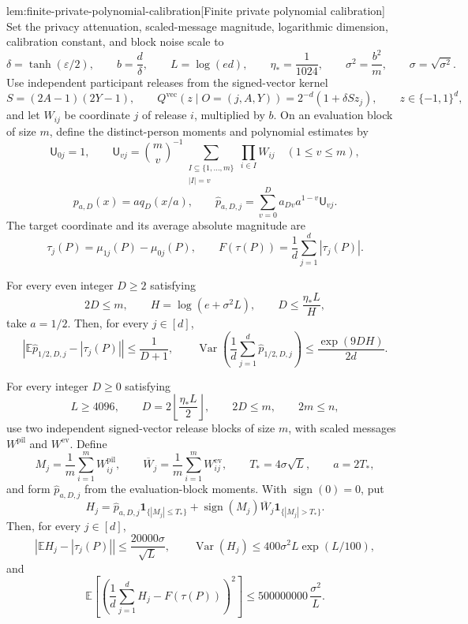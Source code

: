 \documentclass[11pt]{article}
\begin{document}
\begin{lemmav}{lem:finite-private-polynomial-calibration}[Finite private polynomial calibration]
Set the privacy attenuation, scaled-message magnitude, logarithmic dimension, calibration constant, and block noise scale to
\[
 \delta=\tanh(\varepsilon/2),\qquad
 b=\frac d\delta,\qquad
 L=\log(ed),\qquad
 \eta_*=\frac1{1024},\qquad
 \sigma^2=\frac{b^2}{m},\qquad
 \sigma=\sqrt{\sigma^2}.
\]
Use independent participant releases from the signed-vector kernel
\[
 S=(2A-1)(2Y-1),\qquad
 Q^{\mathrm{vec}}(z\mid O=(j,A,Y))
 =2^{-d}(1+\delta S z_j),
 \qquad z\in\{-1,1\}^d,
\]
and let \(W_{ij}\) be coordinate \(j\) of release \(i\), multiplied by \(b\). On an evaluation block of size \(m\), define the distinct-person moments and polynomial estimates by
\[
 \mathsf U_{0j}=1,\qquad
 \mathsf U_{vj}
 =\binom mv^{-1}
   \sum_{\substack{I\subseteq\{1,\ldots,m\}\\|I|=v}}
      \prod_{i\in I}W_{ij}
 \quad(1\le v\le m),
\]
\[
 p_{a,D}(x)=a q_D(x/a),\qquad
 \widehat p_{a,D,j}
 =\sum_{v=0}^D a_{Dv}a^{1-v}\mathsf U_{vj}.
\]
The target coordinate and its average absolute magnitude are
\[
 \tau_j(P)=\mu_{1j}(P)-\mu_{0j}(P),\qquad
 F(\tau(P))=\frac1d\sum_{j=1}^d|\tau_j(P)|.
\]

For every even integer \(D\ge2\) satisfying
\[
 2D\le m,\qquad
 H=\log(e+\sigma^2L),\qquad
 D\le\frac{\eta_*L}{H},
\]
take \(a=1/2\). Then, for every \(j\in[d]\),
\[
 \left|\mathbb E\widehat p_{1/2,D,j}-|\tau_j(P)|\right|
 \le\frac1{D+1},
 \qquad
 \operatorname{Var}\!\left(\frac1d\sum_{j=1}^d
                    \widehat p_{1/2,D,j}\right)
 \le\frac{\exp(9DH)}{2d}.
\]

For every integer \(D\ge0\) satisfying
\[
 L\ge4096,\qquad
 D=2\left\lfloor\frac{\eta_*L}{2}\right\rfloor,\qquad
 2D\le m,\qquad
 2m\le n,
\]
use two independent signed-vector release blocks of size \(m\), with scaled messages \(W^{\mathrm{pil}}\) and \(W^{\mathrm{ev}}\). Define
\[
 M_j=\frac1m\sum_{i=1}^mW^{\mathrm{pil}}_{ij},\qquad
 \overline W_j=\frac1m\sum_{i=1}^mW^{\mathrm{ev}}_{ij},\qquad
 T_*=4\sigma\sqrt L,\qquad a=2T_*,
\]
and form \(\widehat p_{a,D,j}\) from the evaluation-block moments. With \(\operatorname{sign}(0)=0\), put
\[
 H_j=\widehat p_{a,D,j}\mathbf1_{\{|M_j|\le T_*\}}
       +\operatorname{sign}(M_j)\overline W_j
          \mathbf1_{\{|M_j|>T_*\}}.
\]
Then, for every \(j\in[d]\),
\[
 \left|\mathbb EH_j-|\tau_j(P)|\right|
 \le\frac{20000\sigma}{\sqrt L},
 \qquad
 \operatorname{Var}(H_j)
 \le400\sigma^2L\exp(L/100),
\]
and
\[
 \mathbb E\!\left[
   \left(\frac1d\sum_{j=1}^dH_j-F(\tau(P))\right)^2
 \right]
 \le500000000\,\frac{\sigma^2}{L}.
\]
\end{lemmav}
\end{document}
